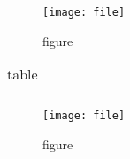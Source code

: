 \documentclass[]{article}
\begin{document}

\begin{figure}                                  %
  \centering
  \texttt{[image: file]}
  \caption{figure}
  \label{fig:illustration}
\end{figure}                                    %

\begin{table}                                   %
  \centering
  \begin{tabular}{c}                            %
  \end{tabular}                                 %
  \caption{table}
  \label{tab:listing}
\end{table}                                     %

\begin{figure}                                  %
  \centering
  \texttt{[image: file]}
  \caption{figure}
  \label{fig:illustration}
\end{figure}                                    %
\end{document}
